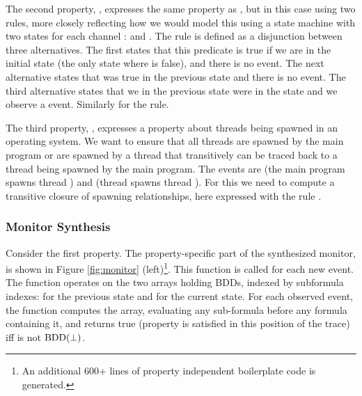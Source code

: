 The second property, , expresses the same 
property as , but in this case using two 
rules, more closely reflecting how we would model this using a state machine with two states for each channel : 
 and . The rule  is defined as a disjunction between three alternatives. The first states that this predicate is true if we are in the initial state 
(the only state where  is false), and there is no  event. The next alternative states that
 was true in the previous state and there is
no  event.
The third alternative states that we in the previous state were
in the  state and we observe a  
event. Similarly for the  rule.

The third property, , expresses a property
about threads being spawned in an operating system. We want to 
ensure that all threads are spawned by the main program or are spawned by a thread that transitively can be traced back to a thread being spawned by the main program. The events are
 (the main program spawns thread ) and
 (thread  spawns thread ).
For this we need to compute a transitive closure of spawning relationships, here expressed with the rule .

\subsubsection{Monitor Synthesis}

Consider the first  property. The property-specific 
part of the synthesized monitor, is shown 
in Figure \ref{fig:monitor} (left)\footnote{An additional 600+ lines of property independent 
boilerplate code is generated.}. This function is called for each new event. The function operates on the two arrays holding BDDs, indexed by subformula indexes:  for the previous state and  for the current state. For each observed event, the function  computes the  array, evaluating any sub-formula before any formula containing it,
and returns true (property is satisfied in this position of the trace)  iff  is not $\mathrm{BDD}(\bot)$. 

